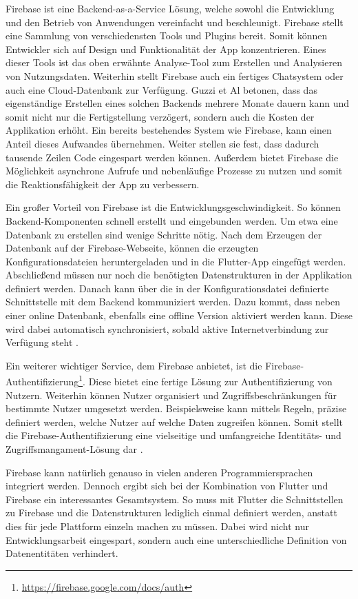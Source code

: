 Firebase ist eine Backend-as-a-Service Lösung, welche sowohl die Entwicklung und den Betrieb von Anwendungen vereinfacht und beschleunigt. Firebase stellt eine Sammlung von verschiedensten Tools und Plugins bereit. Somit können Entwickler sich auf Design und Funktionalität der App konzentrieren. Eines dieser Tools ist das oben erwähnte Analyse-Tool zum Erstellen und Analysieren von Nutzungsdaten. Weiterhin stellt Firebase auch ein fertiges Chatsystem oder auch eine Cloud-Datenbank zur Verfügung. Guzzi et Al \cite{Flutter_Apprentice} betonen, dass das eigenständige Erstellen eines solchen Backends mehrere Monate dauern kann und somit nicht nur die Fertigstellung verzögert, sondern auch die Kosten der Applikation erhöht. Ein bereits bestehendes System wie Firebase, kann einen Anteil dieses Aufwandes übernehmen. Weiter stellen sie fest, dass dadurch tausende Zeilen Code eingespart werden können. Außerdem bietet Firebase die Möglichkeit asynchrone Aufrufe und nebenläufige Prozesse zu nutzen und somit die Reaktionsfähigkeit der App zu verbessern.

Ein großer Vorteil von Firebase ist die Entwicklungsgeschwindigkeit. So können Backend-Komponenten schnell erstellt und eingebunden werden. Um etwa eine Datenbank zu erstellen sind wenige Schritte nötig. Nach dem Erzeugen der Datenbank auf der Firebase-Webseite, können die erzeugten Konfigurationsdateien heruntergeladen und in die Flutter-App eingefügt werden. Abschließend müssen nur noch die benötigten Datenstrukturen in der Applikation definiert werden. Danach kann über die in der Konfigurationsdatei definierte Schnittstelle mit dem Backend kommuniziert werden. Dazu kommt, dass neben einer online Datenbank, ebenfalls eine offline Version aktiviert werden kann. Diese wird dabei automatisch synchronisiert, sobald aktive Internetverbindung zur Verfügung steht \cite{flutter_firebase}.

Ein weiterer wichtiger Service, dem Firebase anbietet, ist die Firebase-Authentifizierung\footnote{\url{https://firebase.google.com/docs/auth}}. Diese bietet eine fertige Lösung zur Authentifizierung von Nutzern. Weiterhin können Nutzer organisiert und Zugriffsbeschränkungen für bestimmte Nutzer umgesetzt werden. Beispielsweise kann mittels Regeln, präzise definiert werden, welche Nutzer auf welche Daten zugreifen können. Somit stellt die Firebase-Authentifizierung eine vielseitige und umfangreiche Identitäts- und Zugriffsmangament-Lösung dar \cite{Flutter_Apprentice}.

Firebase kann natürlich genauso in vielen anderen Programmiersprachen integriert werden. 
Dennoch ergibt sich bei der Kombination von Flutter und Firebase ein interessantes Gesamtsystem.
So muss mit Flutter die Schnittstellen zu Firebase und die Datenstrukturen lediglich einmal definiert werden, anstatt dies für jede Plattform einzeln machen zu müssen.
Dabei wird nicht nur Entwicklungsarbeit eingespart, sondern auch eine unterschiedliche Definition von Datenentitäten verhindert.


